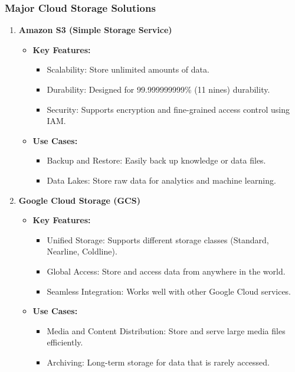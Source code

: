 \documentclass[aspectratio=169]{beamer}
\begin{document}
\begin{frame}
    \frametitle{Major Cloud Storage Solutions}
    \begin{enumerate}
        \item \textbf{Amazon S3 (Simple Storage Service)}
        \begin{itemize}
            \item \textbf{Key Features:}
            \begin{itemize}
                \item Scalability: Store unlimited amounts of data.
                \item Durability: Designed for 99.999999999\% (11 nines) durability.
                \item Security: Supports encryption and fine-grained access control using IAM.
            \end{itemize}
            \item \textbf{Use Cases:}
            \begin{itemize}
                \item Backup and Restore: Easily back up knowledge or data files.
                \item Data Lakes: Store raw data for analytics and machine learning.
            \end{itemize}
        \end{itemize}

        \item \textbf{Google Cloud Storage (GCS)}
        \begin{itemize}
            \item \textbf{Key Features:}
            \begin{itemize}
                \item Unified Storage: Supports different storage classes (Standard, Nearline, Coldline).
                \item Global Access: Store and access data from anywhere in the world.
                \item Seamless Integration: Works well with other Google Cloud services.
            \end{itemize}
            \item \textbf{Use Cases:}
            \begin{itemize}
                \item Media and Content Distribution: Store and serve large media files efficiently.
                \item Archiving: Long-term storage for data that is rarely accessed.
            \end{itemize}
        \end{itemize}
    \end{enumerate}
\end{frame}
\end{document}
